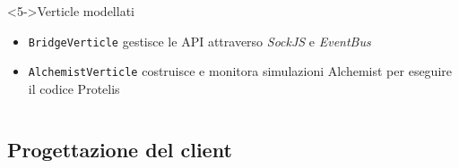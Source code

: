 \begin{frame}{\insertsectionhead}
      \begin{columns}
        \begin{column}{.99\textwidth}
          \begin{block}<5->{Verticle modellati}
            \begin{itemize}
              \item \texttt{BridgeVerticle} gestisce le API attraverso \emph{SockJS} e \emph{EventBus}
              \item \texttt{AlchemistVerticle} costruisce e monitora simulazioni Alchemist per eseguire il codice Protelis
            \end{itemize}
          \end{block}
        \end{column}
      \end{columns}
    \end{frame}

    \subsection{Progettazione del client}




